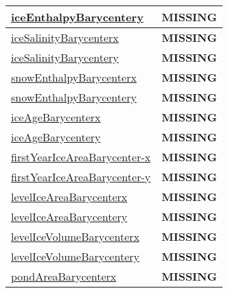{\begin{center}
\begin{longtable}{| p{2.0in} | p{4.0in} |}
    \hline
    \hyperref[subsec:var_sec_tracer_barycenter_iceEnthalpyBarycentery]{iceEnthalpyBarycentery} & {\bf \color{red} MISSING} \\
    \hline
    \hyperref[subsec:var_sec_tracer_barycenter_iceSalinityBarycenterx]{iceSalinityBarycenterx} & {\bf \color{red} MISSING} \\
    \hline
    \hyperref[subsec:var_sec_tracer_barycenter_iceSalinityBarycentery]{iceSalinityBarycentery} & {\bf \color{red} MISSING} \\
    \hline
    \hyperref[subsec:var_sec_tracer_barycenter_snowEnthalpyBarycenterx]{snowEnthalpyBarycenterx} & {\bf \color{red} MISSING} \\
    \hline
    \hyperref[subsec:var_sec_tracer_barycenter_snowEnthalpyBarycentery]{snowEnthalpyBarycentery} & {\bf \color{red} MISSING} \\
    \hline
    \hyperref[subsec:var_sec_tracer_barycenter_iceAgeBarycenterx]{iceAgeBarycenterx} & {\bf \color{red} MISSING} \\
    \hline
    \hyperref[subsec:var_sec_tracer_barycenter_iceAgeBarycentery]{iceAgeBarycentery} & {\bf \color{red} MISSING} \\
    \hline
    \hyperref[subsec:var_sec_tracer_barycenter_firstYearIceAreaBarycenterx]{firstYearIceAreaBarycenter-}\hyperref[subsec:var_sec_tracer_barycenter_firstYearIceAreaBarycenterx]{x  }& {\bf \color{red} MISSING} \\
    \hline
    \hyperref[subsec:var_sec_tracer_barycenter_firstYearIceAreaBarycentery]{firstYearIceAreaBarycenter-}\hyperref[subsec:var_sec_tracer_barycenter_firstYearIceAreaBarycentery]{y  }& {\bf \color{red} MISSING} \\
    \hline
    \hyperref[subsec:var_sec_tracer_barycenter_levelIceAreaBarycenterx]{levelIceAreaBarycenterx} & {\bf \color{red} MISSING} \\
    \hline
    \hyperref[subsec:var_sec_tracer_barycenter_levelIceAreaBarycentery]{levelIceAreaBarycentery} & {\bf \color{red} MISSING} \\
    \hline
    \hyperref[subsec:var_sec_tracer_barycenter_levelIceVolumeBarycenterx]{levelIceVolumeBarycenterx} & {\bf \color{red} MISSING} \\
    \hline
    \hyperref[subsec:var_sec_tracer_barycenter_levelIceVolumeBarycentery]{levelIceVolumeBarycentery} & {\bf \color{red} MISSING} \\
    \hline
    \hyperref[subsec:var_sec_tracer_barycenter_pondAreaBarycenterx]{pondAreaBarycenterx} & {\bf \color{red} MISSING} \\

\end{longtable}
\end{center}}
